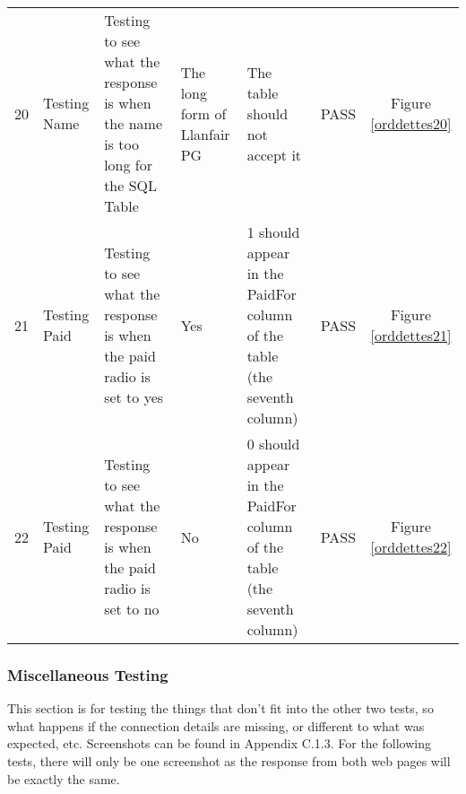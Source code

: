 \documentclass[
11pt, %
a4paper, %
oneside, %
headinclude,footinclude, %
BCOR5mm, %
]{scrartcl}
\begin{document}
\begin{longtable}[l]{|c|p{2.5cm}|p{3cm}|p{3cm}|p{3cm}|c|c|}
			20 & Testing Name & Testing to see what the response is when the name is too long for the SQL Table & The long form of Llanfair PG & The table should not accept it & PASS & Figure \ref{orddettes20}\\
			21 & Testing Paid & Testing to see what the response is when the paid radio is set to yes & Yes & 1 should appear in the PaidFor column of the table (the seventh column) & PASS & Figure \ref{orddettes21} \\
			22 & Testing Paid & Testing to see what the response is when the paid radio is set to no & No & 0 should appear in the PaidFor column of the table (the seventh column) & PASS & Figure \ref{orddettes22} \\
		\end{longtable}
\subsubsection{Miscellaneous Testing}
		This section is for testing the things that don't fit into the other two tests, so what happens if the connection details are missing, or different to what was expected, etc. Screenshots can be found in Appendix C.1.3. For the following tests, there will only be one screenshot as the response from both web pages will be exactly the same. 
\end{document}
